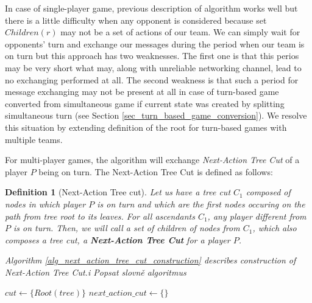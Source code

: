 In case of single-player game, previous description of algorithm works well but there is a little
difficulty when any opponent is considered because set $Children(r)$ may not be a set of actions of
our team. We can simply wait for opponents' turn and exchange our messages during the period
when our team is on turn but this approach has two weaknesses. The first one is that this
perios may be very short what may, along with unreliable networking channel, lead to no
exchanging performed at all. The second weakness is that such a period for message
exchanging may not be present at all in case of turn-based game converted from simultaneous
game if current state was created by splitting simultaneous turn (see Section 
\ref{sec_turn_based_game_conversion}). We resolve this situation by extending definition of the
root for turn-based games with multiple teams. 

For multi-player games, the algorithm will exchange \emph{Next-Action Tree Cut} of a player $P$
being on turn. The Next-Action Tree Cut is defined as follows:

\newtheorem*{defnextactiontreecut}{Definition}
\begin{defnextactiontreecut}[Next-Action Tree cut]
Let us have a tree cut $C_1$ composed of nodes in which player $P$ is on turn and which are the first
nodes occuring on the path from tree root to its leaves. For all ascendants $C_1$, any player
different from $P$ is on turn. Then, we will call a set of children of nodes from $C_1$, which
also composes a tree cut, a \textbf{Next-Action Tree Cut} for a player $P$.

Algorithm \ref{alg_next_action_tree_cut_construction} describes construction of Next-Action
Tree Cut.i \emph{Popsat slovně algoritmus}

\end{defnextactiontreecut}

\begin{algorithm}
\DontPrintSemicolon
\caption{$BuildNextActionTreeCut(tree, player)$\label{alg_next_action_tree_cut_construction}}
$cut \leftarrow \{Root(tree)\}$ \;
$next\_action\_cut \leftarrow \{\}$ \;
\end{algorithm}

